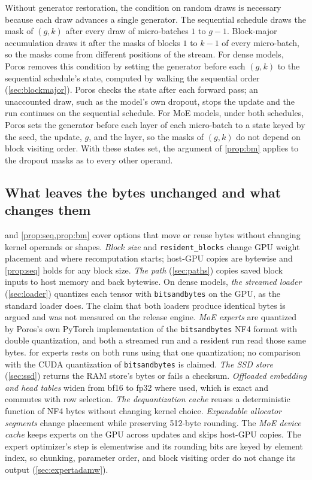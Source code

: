 \documentclass[11pt,letterpaper]{article}
\theoremstyle{definition}
\theoremstyle{plain}
\newcommand{\code}[1]{\texttt{\small #1}}
\begin{document}
Without generator restoration, the condition on random draws is
necessary because each draw advances a single generator.
The sequential schedule draws the mask of $(g,k)$ after every draw of
micro-batches $1$ to $g-1$.
Block-major accumulation draws it after the masks of blocks $1$ to $k-1$
of every micro-batch, so the masks come from different positions of the
stream.
For dense models, Poros removes this condition by setting the generator
before each $(g,k)$ to the sequential schedule's state, computed by
walking the sequential order (\cref{sec:blockmajor}).
Poros checks the state after each forward pass; an unaccounted draw, such
as the model's own dropout, stops the update and the run continues on the
sequential schedule.
For MoE models, under both schedules, Poros sets the generator before
each layer of each micro-batch to a state keyed by the seed, the update,
$g$, and the layer, so the masks of $(g,k)$ do not depend on block
visiting order.
With these states set, the argument of \cref{prop:bm} applies to the
dropout masks as to every other operand.

\subsection{What leaves the bytes unchanged and what changes them}\label{sec:corollaries}

 and \cref{prop:seq,prop:bm} cover options that move or
reuse bytes without changing kernel operands or shapes.
\emph{Block size} and \code{resident\_blocks} change GPU weight placement
and where recomputation starts; host-GPU copies are bytewise and
\cref{prop:seq} holds for any block size.
\emph{The path} (\cref{sec:paths}) copies saved block inputs to host
memory and back bytewise.
On dense models, \emph{the streamed loader} (\cref{sec:loader}) quantizes
each tensor with \code{bitsandbytes} on the GPU, as the standard loader
does.
The claim that both loaders produce identical bytes is argued and was not
measured on the release engine.
\emph{MoE experts} are quantized by Poros's own PyTorch implementation of
the \code{bitsandbytes} NF4 format with double quantization, and both a
streamed run and a resident run read those same bytes.
 for experts rests on both runs using that one
quantization; no comparison with the CUDA quantization of
\code{bitsandbytes} is claimed.
\emph{The SSD store} (\cref{sec:ssd}) returns the RAM store's bytes or
fails a checksum.
\emph{Offloaded embedding and head tables} widen from bf16 to fp32 where
used, which is exact and commutes with row selection.
\emph{The dequantization cache} reuses a deterministic function of NF4
bytes without changing kernel choice.
\emph{Expandable allocator segments} change placement while preserving
512-byte rounding.
The \emph{MoE device cache} keeps experts on the GPU across updates and
skips host-GPU copies.
The expert optimizer's step is elementwise and its rounding bits are keyed by element index, so chunking, parameter order, and block visiting order do not change its output (\cref{sec:expertadamw}).
\end{document}
